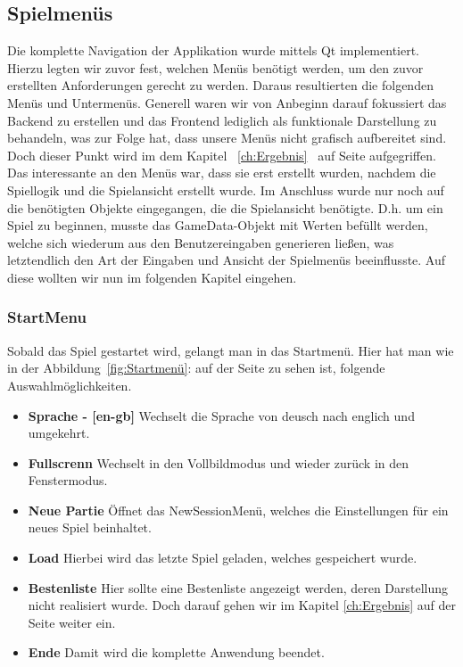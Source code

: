 \documentclass[a4paper]{scrartcl}
\begin{document}
\subsection{Spielmenüs}\label{ch:Spielmenüs}
Die komplette Navigation der Applikation wurde mittels Qt implementiert. Hierzu legten wir zuvor fest, welchen Menüs benötigt werden, um den zuvor erstellten Anforderungen gerecht zu werden. Daraus resultierten die folgenden Menüs und Untermenüs. Generell waren wir von Anbeginn darauf fokussiert das Backend zu erstellen und das Frontend lediglich als funktionale Darstellung zu behandeln, was zur Folge hat, dass unsere Menüs nicht grafisch aufbereitet sind. Doch dieser Punkt wird im dem Kapitel ~\ref{ch:Ergebnis}  \glqq{}\grqq \ auf Seite \pageref{ch:Ergebnis} aufgegriffen.
\\
Das interessante an den Menüs war, dass sie erst erstellt wurden, nachdem die Spiellogik und die Spielansicht erstellt wurde. Im Anschluss wurde nur noch auf die benötigten Objekte eingegangen, die die Spielansicht benötigte. D.h. um ein Spiel zu beginnen, musste das GameData-Objekt mit Werten befüllt werden, welche sich wiederum aus den Benutzereingaben generieren ließen, was letztendlich den Art der Eingaben und Ansicht der Spielmenüs beeinflusste. Auf diese wollten wir nun im folgenden Kapitel eingehen.

\subsubsection{StartMenu}\label{ch:StartMenu}
Sobald das Spiel gestartet wird, gelangt man in das Startmenü. Hier hat man wie in der Abbildung~\ref{fig:Startmenü}: auf der Seite \pageref{fig:Startmenü} zu sehen ist, folgende Auswahlmöglichkeiten.

\begin{itemize}
	\item \textbf{Sprache - [en-gb]} Wechselt die Sprache von deusch nach englich und umgekehrt.
	\item \textbf{Fullscrenn} Wechselt in den Vollbildmodus und wieder zurück in den Fenstermodus.
	\item \textbf{Neue Partie} Öffnet das NewSessionMenü, welches die Einstellungen für ein neues Spiel beinhaltet.
	\item \textbf{Load} Hierbei wird das letzte Spiel geladen, welches gespeichert wurde.
	\item \textbf{Bestenliste} Hier sollte eine Bestenliste angezeigt werden, deren Darstellung nicht realisiert wurde. Doch darauf gehen wir im Kapitel \ref{ch:Ergebnis} auf der Seite \pageref{ch:Ergebnis} weiter ein.
	\item \textbf{Ende} Damit wird die komplette Anwendung beendet.
\end{itemize}
\end{document}
